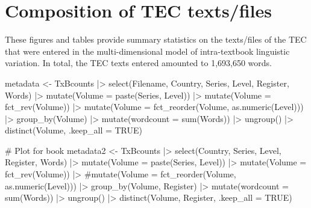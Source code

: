 \documentclass[
  letterpaper,
  DIV=11,
  numbers=noendperiod]{scrreprt}
\newenvironment{Shaded}{\begin{snugshade}}{\end{snugshade}}
\newcommand{\AttributeTok}[1]{\textcolor[rgb]{0.40,0.45,0.13}{#1}}
\newcommand{\CommentTok}[1]{\textcolor[rgb]{0.37,0.37,0.37}{#1}}
\newcommand{\ConstantTok}[1]{\textcolor[rgb]{0.56,0.35,0.01}{#1}}
\newcommand{\FunctionTok}[1]{\textcolor[rgb]{0.28,0.35,0.67}{#1}}
\newcommand{\NormalTok}[1]{\textcolor[rgb]{0.00,0.23,0.31}{#1}}
\newcommand{\OtherTok}[1]{\textcolor[rgb]{0.00,0.23,0.31}{#1}}
\newcommand{\SpecialCharTok}[1]{\textcolor[rgb]{0.37,0.37,0.37}{#1}}
\begin{document}
\section{Composition of TEC
texts/files}\label{composition-of-tec-textsfiles}

These figures and tables provide summary statistics on the texts/files
of the TEC that were entered in the multi-dimensional model of
intra-textbook linguistic variation. In total, the TEC texts entered
amounted to 1,693,650 words.

\begin{Shaded}
\begin{Highlighting}[]
\NormalTok{metadata }\OtherTok{\textless{}{-}}\NormalTok{ TxBcounts }\SpecialCharTok{|\textgreater{}}  
  \FunctionTok{select}\NormalTok{(Filename, Country, Series, Level, Register, Words) }\SpecialCharTok{|\textgreater{}}  
  \FunctionTok{mutate}\NormalTok{(}\AttributeTok{Volume =} \FunctionTok{paste}\NormalTok{(Series, Level)) }\SpecialCharTok{|\textgreater{}}  
  \FunctionTok{mutate}\NormalTok{(}\AttributeTok{Volume =} \FunctionTok{fct\_rev}\NormalTok{(Volume)) }\SpecialCharTok{|\textgreater{}}  
  \FunctionTok{mutate}\NormalTok{(}\AttributeTok{Volume =} \FunctionTok{fct\_reorder}\NormalTok{(Volume, }\FunctionTok{as.numeric}\NormalTok{(Level))) }\SpecialCharTok{|\textgreater{}}  
  \FunctionTok{group\_by}\NormalTok{(Volume) }\SpecialCharTok{|\textgreater{}}  
  \FunctionTok{mutate}\NormalTok{(}\AttributeTok{wordcount =} \FunctionTok{sum}\NormalTok{(Words)) }\SpecialCharTok{|\textgreater{}}  
  \FunctionTok{ungroup}\NormalTok{() }\SpecialCharTok{|\textgreater{}}  
  \FunctionTok{distinct}\NormalTok{(Volume, }\AttributeTok{.keep\_all =} \ConstantTok{TRUE}\NormalTok{)}

\CommentTok{\# Plot for book}
\NormalTok{metadata2 }\OtherTok{\textless{}{-}}\NormalTok{ TxBcounts }\SpecialCharTok{|\textgreater{}}  
  \FunctionTok{select}\NormalTok{(Country, Series, Level, Register, Words) }\SpecialCharTok{|\textgreater{}}  
  \FunctionTok{mutate}\NormalTok{(}\AttributeTok{Volume =} \FunctionTok{paste}\NormalTok{(Series, Level)) }\SpecialCharTok{|\textgreater{}}  
  \FunctionTok{mutate}\NormalTok{(}\AttributeTok{Volume =} \FunctionTok{fct\_rev}\NormalTok{(Volume)) }\SpecialCharTok{|\textgreater{}}  
  \CommentTok{\#mutate(Volume = fct\_reorder(Volume, as.numeric(Level))) |\textgreater{}  }
  \FunctionTok{group\_by}\NormalTok{(Volume, Register) }\SpecialCharTok{|\textgreater{}}  
  \FunctionTok{mutate}\NormalTok{(}\AttributeTok{wordcount =} \FunctionTok{sum}\NormalTok{(Words)) }\SpecialCharTok{|\textgreater{}}  
  \FunctionTok{ungroup}\NormalTok{() }\SpecialCharTok{|\textgreater{}}  
  \FunctionTok{distinct}\NormalTok{(Volume, Register, }\AttributeTok{.keep\_all =} \ConstantTok{TRUE}\NormalTok{)}


\end{Highlighting}
\end{Shaded}
\end{document}
